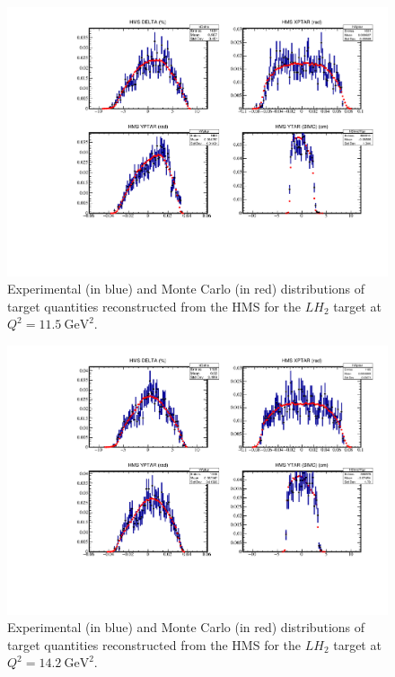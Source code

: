 \begin{figure}[!h]
    \centering
    \includegraphics[page=1,width=1.0\textwidth]{pass5_report/Report_h115.pdf}
    \caption{
            Experimental (in blue) and Monte Carlo (in red) distributions of
            target quantities reconstructed from the HMS for
            the $LH_2$ target at $Q^2=\SI{11.5}{\giga\electronvolt\squared}$.
            }
    \label{fig:Report_h115.pdf}
\end{figure}


\begin{figure}[!h]
    \centering
    \includegraphics[page=1,width=1.0\textwidth]{pass5_report/Report_h143.pdf}
    \caption{
            Experimental (in blue) and Monte Carlo (in red) distributions of
            target quantities reconstructed from the HMS for
            the $LH_2$ target at $Q^2=\SI{14.2}{\giga\electronvolt\squared}$.
            }
    \label{fig:Report_h143.pdf}
\end{figure}


